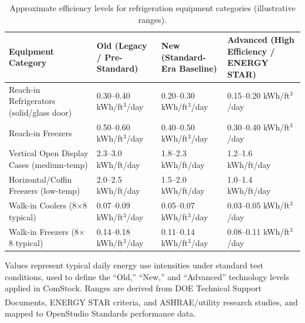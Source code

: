 \begin{table}[h!]
\centering
\begin{threeparttable}
\caption{Approximate efficiency levels for refrigeration equipment categories (illustrative ranges).}
\label{tab:refrigeration_efficiency_levels}
\begin{tabular}{|p{1.8in}|p{1.2in}|p{1.2in}|p{1.2in}|}
\hline
\textbf{Equipment Category} & \textbf{Old (Legacy / Pre-Standard)} & \textbf{New (Standard-Era Baseline)} & \textbf{Advanced (High Efficiency / ENERGY STAR)} \\ \hline
Reach-in Refrigerators (solid/glass door) & 0.30--0.40 kWh/ft$^3$/day & 0.20--0.30 kWh/ft$^3$/day & 0.15--0.20 kWh/ft$^3$/day \\ \hline
Reach-in Freezers & 0.50--0.60 kWh/ft$^3$/day & 0.40--0.50 kWh/ft$^3$/day & 0.30--0.40 kWh/ft$^3$/day \\ \hline
Vertical Open Display Cases (medium-temp) & 2.3--3.0 kWh/ft/day & 1.8--2.3 kWh/ft/day & 1.2--1.6 kWh/ft/day \\ \hline
Horizontal/Coffin Freezers (low-temp) & 2.0--2.5 kWh/ft/day & 1.5--2.0 kWh/ft/day & 1.0--1.4 kWh/ft/day \\ \hline
Walk-in Coolers (8$\times$8 typical) & 0.07--0.09 kWh/ft$^3$/day & 0.05--0.07 kWh/ft$^3$/day & 0.03--0.05 kWh/ft$^3$/day \\ \hline
Walk-in Freezers (8$\times$8 typical) & 0.14--0.18 kWh/ft$^3$/day & 0.11--0.14 kWh/ft$^3$/day & 0.08--0.11 kWh/ft$^3$/day \\ \hline
\end{tabular}
\begin{tablenotes}
\footnotesize
\item Values represent typical daily energy use intensities under standard test conditions, used to define the ``Old,'' ``New,'' and ``Advanced'' technology levels applied in ComStock. Ranges are derived from DOE Technical Support Documents, ENERGY STAR\textsuperscript{\textregistered} criteria, and ASHRAE/utility research studies, and mapped to OpenStudio Standards performance data.
\end{tablenotes}
\end{threeparttable}
\end{table}


